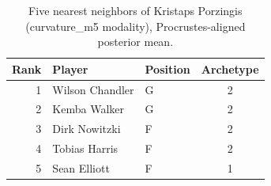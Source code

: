 \begin{table}[htbp]
  \centering\small
  \begin{tabular}{rllc}
    \toprule
    Rank & Player & Position & Archetype \\
    \midrule
    1 & Wilson Chandler & G & 2 \\
    2 & Kemba Walker & G & 2 \\
    3 & Dirk Nowitzki & F & 2 \\
    4 & Tobias Harris & F & 2 \\
    5 & Sean Elliott & F & 1 \\
    \bottomrule
  \end{tabular}
  \caption{Five nearest neighbors of Kristaps Porzingis (curvature_m5 modality), Procrustes-aligned posterior mean.}
  \label{tab:Kristaps_Porzingis_neighbors_curvature_m5}
\end{table}


